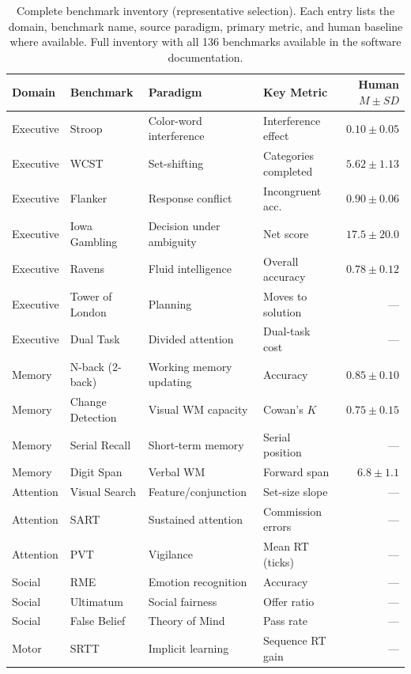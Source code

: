 \documentclass[11pt,letterpaper]{article}
\begin{document}
\begin{table}[p]
\centering
\caption{Complete benchmark inventory (representative selection). Each entry lists the domain, benchmark name, source paradigm, primary metric, and human baseline where available. Full inventory with all 136 benchmarks available in the software documentation.}
\label{tab:inventory}
\small
\begin{tabular}{@{}llllr@{}}
\toprule
\textbf{Domain} & \textbf{Benchmark} & \textbf{Paradigm} & \textbf{Key Metric} & \textbf{Human $M \pm SD$} \\
\midrule
Executive & Stroop & Color-word interference & Interference effect & $0.10 \pm 0.05$ \\
Executive & WCST & Set-shifting & Categories completed & $5.62 \pm 1.13$ \\
Executive & Flanker & Response conflict & Incongruent acc. & $0.90 \pm 0.06$ \\
Executive & Iowa Gambling & Decision under ambiguity & Net score & $17.5 \pm 20.0$ \\
Executive & Ravens & Fluid intelligence & Overall accuracy & $0.78 \pm 0.12$ \\
Executive & Tower of London & Planning & Moves to solution & --- \\
Executive & Dual Task & Divided attention & Dual-task cost & --- \\
\midrule
Memory & N-back (2-back) & Working memory updating & Accuracy & $0.85 \pm 0.10$ \\
Memory & Change Detection & Visual WM capacity & Cowan's $K$ & $0.75 \pm 0.15$ \\
Memory & Serial Recall & Short-term memory & Serial position & --- \\
Memory & Digit Span & Verbal WM & Forward span & $6.8 \pm 1.1$ \\
\midrule
Attention & Visual Search & Feature/conjunction & Set-size slope & --- \\
Attention & SART & Sustained attention & Commission errors & --- \\
Attention & PVT & Vigilance & Mean RT (ticks) & --- \\
\midrule
Social & RME & Emotion recognition & Accuracy & --- \\
Social & Ultimatum & Social fairness & Offer ratio & --- \\
Social & False Belief & Theory of Mind & Pass rate & --- \\
\midrule
Motor & SRTT & Implicit learning & Sequence RT gain & --- \\

\end{tabular}
\end{table}
\end{document}
